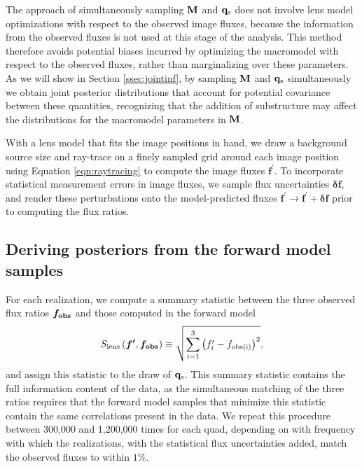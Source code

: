 The approach of simultaneously sampling ${\bf{M}}$ and ${\bf{q}_{\rm{s}}}$ does not involve lens model optimizations with respect to the observed image fluxes, because the information from the observed fluxes is not used at this stage of the analysis. This method therefore avoids potential biases incurred by optimizing the macromodel with respect to the observed fluxes, rather than marginalizing over these parameters. As we will show in Section \ref{ssec:jointinf}, by sampling ${\bf{M}}$ and ${\bf{q}_{\rm{s}}}$ simultaneously we obtain joint posterior distributions that account for potential covariance between these quantities, recognizing that the addition of substructure may affect the distributions for the macromodel parameters in ${\bf{M}}$. 

With a lens model that fits the image positions in hand, we draw a background source size and ray-trace on a finely sampled grid around each image position using Equation \ref{eqn:raytracing} to compute the image fluxes $\boldsymbol{f^{\prime}}$. To incorporate statistical measurement errors in image fluxes, we sample flux uncertainties $\boldsymbol{\delta f}$, and render these perturbations onto the model-predicted fluxes $\boldsymbol{f^{\prime}} \rightarrow\boldsymbol{f^{\prime}} + \boldsymbol{\delta f}$ prior to computing the flux ratios. 

\subsection{Deriving posteriors from the forward model samples}
For each realization, we compute a summary statistic between the three observed flux ratios $\boldsymbol{f_{\rm{obs}}}$ and those computed in the forward model 
\begin{equation}
\label{eqn:summary_stat}
S_{\rm{lens}} \left(\boldsymbol{f^{\prime}},\boldsymbol{f_{\rm{obs}}} \right) \equiv \sqrt{\sum_{i=1}^{3} \left({f}^{\prime}_{i} - f_{\rm{obs(i)}} \right)^2},
\end{equation}
and assign this statistic to the draw of ${\bf{q}_{\rm{s}}}$. This summary statistic contains the full information content of the data, as the simultaneous matching of the three ratios requires that the forward model samples that minimize this statistic contain the same correlations present in the data. We repeat this procedure between 300,000 and 1,200,000 times for each quad, depending on with frequency with which the realizations, with the statistical flux uncertainties added, match the observed fluxes to within $1\%$. 

